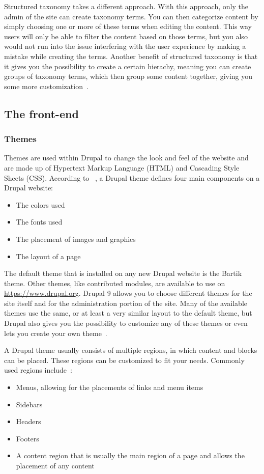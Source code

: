 Structured taxonomy takes a different approach. With this approach, only the admin of the site can create taxonomy terms. You can then categorize content by simply choosing one or more of these terms when editing the content. This way users will only be able to filter the content based on those terms, but you also would not run into the issue interfering with the user experience by making a mistake while creating the terms. Another benefit of structured taxonomy is that it gives you the possibility to create a certain hierachy, meaning you can create groups of taxonomy terms, which then group some content together, giving you some more customization~\autocite{Tomlinson2015}.


\subsection{The front-end}

\subsubsection{Themes}

Themes are used within Drupal to change the look and feel of the website and are made up of Hypertext Markup Language (HTML) and Cascading Style Sheets (CSS). According to ~\textcite{Tomlinson2015}, a Drupal theme defines four main components on a Drupal website: 

\begin{itemize}
	\item  The colors used
	\item  The fonts used
	\item  The placement of images and graphics
	\item  The layout of a page
\end{itemize}

The default theme that is installed on any new Drupal website is the Bartik theme. Other themes, like contributed modules, are available to use on \url{https://www.drupal.org}. Drupal 9 allows you to choose different themes for the site itself and for the administration portion of the site. Many of the available themes use the same, or at least a very similar layout to the default theme, but Drupal also gives you the possibility to customize any of these themes or even lets you create your own theme~\autocite{Tomlinson2015}.

A Drupal theme usually consists of multiple regions, in which content and blocks can be placed. These regions can be customized to fit your needs. Commonly used regions include~\autocite{Tomlinson2015}: 
\begin{itemize}
	\item  Menus, allowing for the placements of links and menu items
	\item  Sidebars
	\item  Headers
	\item  Footers
	\item  A content region that is usually the main region of a page and allows the placement of any content
\end{itemize}

